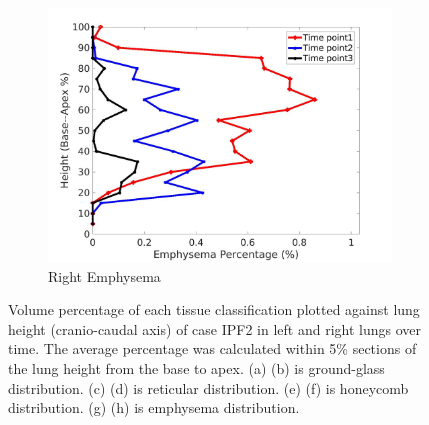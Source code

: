 \begin{figure}[H]
\begin{subfigure}{.42\linewidth}
  \includegraphics[width=\linewidth,trim={{.0\wd0} {.0\wd0} {.0\wd0} {.0\wd0}},clip]{Appendix/Image_AppexA/BaseToApex/IPF2RightLungEmphysemaDiseaseAgainstHeight.jpg}
  \caption{Right Emphysema}
  \label{fig:IPF2DiseaseAgainstHeight-h}
\end{subfigure}
\caption{Volume percentage of each tissue classification plotted against lung height (cranio-caudal axis) of case IPF2 in left and right lungs over time. The average percentage was calculated within 5\% sections of the lung height from the base to apex. (a) (b) is ground-glass distribution. (c) (d) is reticular distribution. (e) (f) is honeycomb distribution. (g) (h) is emphysema distribution.}
\label{fig:IPF2DiseaseAgainstHeight}
\end{figure}

